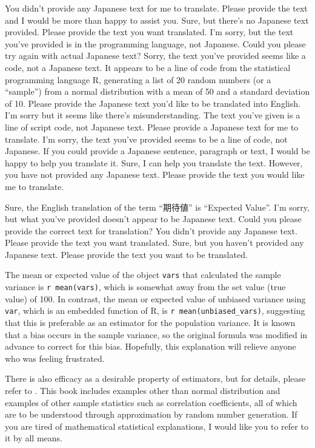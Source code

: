 \documentclass[
  a4paper,
]{book}
\begin{document}
You didn't provide any Japanese text for me to translate. Please provide
the text and I would be more than happy to assist you. Sure, but there's
no Japanese text provided. Please provide the text you want translated.
I'm sorry, but the text you've provided is in the programming language,
not Japanese. Could you please try again with actual Japanese text?
Sorry, the text you've provided seems like a code, not a Japanese text.
It appears to be a line of code from the statistical programming
language R, generating a list of 20 random numbers (or a ``sample'')
from a normal distribution with a mean of 50 and a standard deviation of
10. Please provide the Japanese text you'd like to be translated into
English. I'm sorry but it seems like there's misunderstanding. The text
you've given is a line of script code, not Japanese text. Please provide
a Japanese text for me to translate. I'm sorry, the text you've provided
seems to be a line of code, not Japanese. If you could provide a
Japanese sentence, paragraph or text, I would be happy to help you
translate it. Sure, I can help you translate the text. However, you have
not provided any Japanese text. Please provide the text you would like
me to translate.

Sure, the English translation of the term ``期待値'' is ``Expected
Value''. I'm sorry, but what you've provided doesn't appear to be
Japanese text. Could you please provide the correct text for
translation? You didn't provide any Japanese text. Please provide the
text you want translated. Sure, but you haven't provided any Japanese
text. Please provide the text you want to be translated.

The mean or expected value of the object \texttt{vars} that calculated
the sample variance is \texttt{r\ mean(vars)}, which is somewhat away
from the set value (true value) of 100. In contrast, the mean or
expected value of unbiased variance using \texttt{var}, which is an
embedded function of R, is \texttt{r\ mean(unbiased\_vars)}, suggesting
that this is preferable as an estimator for the population variance. It
is known that a bias occurs in the sample variance, so the original
formula was modified in advance to correct for this bias. Hopefully,
this explanation will relieve anyone who was feeling frustrated.

There is also efficacy as a desirable property of estimators, but for
details, please refer to \textcite{kosugi2023}. This book includes
examples other than normal distribution and examples of other sample
statistics such as correlation coefficients, all of which are to be
understood through approximation by random number generation. If you are
tired of mathematical statistical explanations, I would like you to
refer to it by all means.
\end{document}

